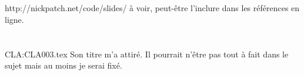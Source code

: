 \section{}

\section{}
http://nickpatch.net/code/slides/ à voir, peut-être l'inclure dans les références en ligne.

\section{}

\section{}
{CLA:CLA003.tex}
Son titre m'a attiré. Il pourrait n'être pas tout à fait dans le sujet mais au moins je serai fixé.